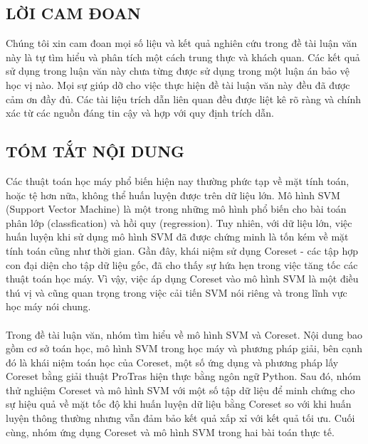 \documentclass[a4paper, 12pt, oneside]{report}
\begin{document}
\newpage
\begin{titlepage}
\chapter*{LỜI CAM ĐOAN}
Chúng tôi xin cam đoan mọi số liệu và kết quả nghiên cứu trong đề tài luận văn này là tự tìm hiểu và phân tích một cách trung thực và khách quan. Các kết quả sử dụng trong luận văn này chưa từng được sử dụng trong một luận án bảo vệ học vị nào. Mọi sự giúp dỡ cho việc thực hiện đề tài luận văn này đều đã được cảm ơn đầy đủ. Các tài liệu trích dẫn liên quan đều được liệt kê rõ ràng và chính xác từ các nguồn đáng tin cậy và hợp với quy định trích dẫn.
\end{titlepage}
\newpage
\begin{titlepage}
\chapter*{TÓM TẮT NỘI DUNG}
Các thuật toán học máy phổ biến hiện nay thường phức tạp về mặt tính toán, hoặc tệ hơn nữa, không thể huấn luyện được trên dữ liệu lớn. Mô hình SVM (Support Vector Machine) là một trong những mô hình phổ biến cho bài toán phân lớp (classfication) và hồi quy (regression). Tuy nhiên, với dữ liệu lớn, việc huấn luyện khi sử dụng mô hình SVM đã được chứng minh là tốn kém về mặt tính toán cũng như thời gian. Gần đây, khái niệm sử dụng Coreset - các tập hợp con đại diện cho tập dữ liệu gốc, đã cho thấy sự hứa hẹn trong việc tăng tốc các thuật toán học máy. Vì vậy, việc áp dụng Coreset vào mô hình SVM là một điều thú vị và cũng quan trọng trong việc cải tiến SVM nói riêng và trong lĩnh vực học máy nói chung.\\ \\
Trong đề tài luận văn, nhóm tìm hiểu về mô hình SVM và Coreset. Nội dung bao gồm cơ sở toán học, mô hình SVM trong học máy và phương pháp giải, bên cạnh đó là khái niệm toán học của Coreset, một số ứng dụng và phương pháp lấy Coreset bằng giải thuật ProTras hiện thực bằng ngôn ngữ Python. Sau đó, nhóm thử nghiệm Coreset và mô hình SVM với một số tập dữ liệu để minh chứng cho sự hiệu quả về mặt tốc độ khi huấn luyện dữ liệu bằng Coreset so với khi huấn luyện thông thường nhưng vẫn đảm bảo kết quả xấp xỉ với kết quả tối ưu. Cuối cùng, nhóm ứng dụng Coreset và mô hình SVM trong hai bài toán thực tế.

\end{titlepage}

\listoffigures
{} %
\cleardoublepage
{}
\listoftables
{} %
\cleardoublepage
{}
\end{document}
